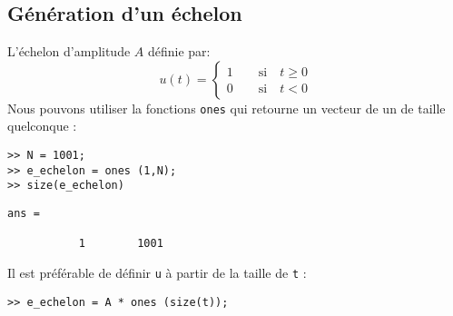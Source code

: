 \subsection{Génération d'un échelon}
L'échelon d'amplitude $A$ définie par:
\[
    u(t)=\begin{cases}
        1 \qquad \textrm{si} \quad t\geq 0 \\
        0 \qquad \textrm{si} \quad t<0
         \end{cases}
\]
Nous pouvons utiliser la fonctions \texttt{ones} qui retourne un vecteur 
de un de taille quelconque :  
\begin{verbatim}
>> N = 1001;
>> e_echelon = ones (1,N);
>> size(e_echelon)
\end{verbatim}
\begin{verbatim}
ans =

           1        1001
\end{verbatim}
Il est préférable de définir \texttt{u} à partir de la taille de \texttt{t} :
\begin{verbatim}
>> e_echelon = A * ones (size(t));
\end{verbatim}
